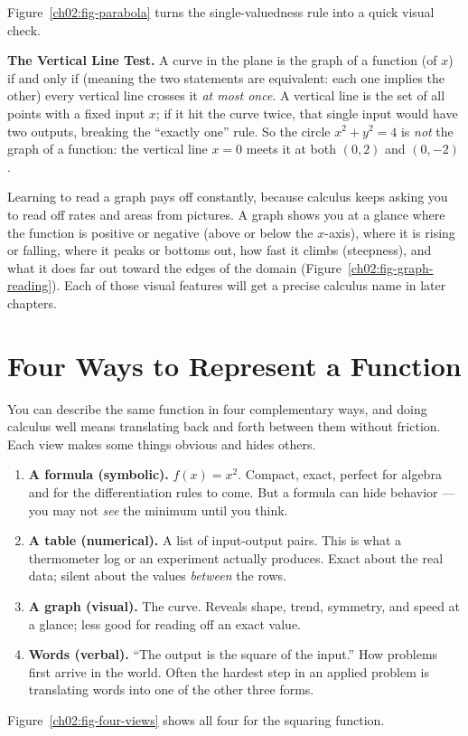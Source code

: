 Figure~\ref{ch02:fig-parabola} turns the single-valuedness rule into a quick visual
check.
\begin{focusbox}
\textbf{The Vertical Line Test.}\quad
A curve in the plane is the graph of a function (of $x$) if and only if (meaning
the two statements are equivalent: each one implies the other) every
vertical line crosses it \emph{at most once}. A vertical line is the set of all
points with a fixed input $x$; if it hit the curve twice, that single input would
have two outputs, breaking the ``exactly one'' rule. So the circle $x^2+y^2=4$ is
\emph{not} the graph of a function: the vertical line $x=0$ meets it at both
$(0,2)$ and $(0,-2)$.
\end{focusbox}
Learning to read a graph pays off constantly, because calculus keeps asking you
to read off rates and areas from pictures. A graph shows you at a glance where the
function is positive or negative (above or below the $x$-axis), where it is rising
or falling, where it peaks or bottoms out, how fast it climbs (steepness), and what
it does far out toward the edges of the domain (Figure~\ref{ch02:fig-graph-reading}).
Each of those visual features will
get a precise calculus name in later chapters.
\section{Four Ways to Represent a Function}
\label{ch02:four-representations}
You can describe the same function in four complementary ways, and doing calculus well means translating back and forth between them without friction. Each view makes
some things obvious and hides others.
\begin{enumerate}
  \item \textbf{A formula (symbolic).} $f(x) = x^2$. Compact, exact, perfect for
        algebra and for the differentiation rules to come. But a formula can hide
        behavior --- you may not \emph{see} the minimum until you think.
  \item \textbf{A table (numerical).} A list of input-output pairs. This is what a
        thermometer log or an experiment actually produces. Exact about the real
        data; silent about the values \emph{between} the rows.
  \item \textbf{A graph (visual).} The curve. Reveals shape, trend, symmetry, and
        speed at a glance; less good for reading off an exact value.
  \item \textbf{Words (verbal).} ``The output is the square of the input.''
        How problems first arrive in the world. Often the hardest step in an
        applied problem is translating words into one of the other three forms.
\end{enumerate}
Figure~\ref{ch02:fig-four-views} shows all four for the squaring function.

